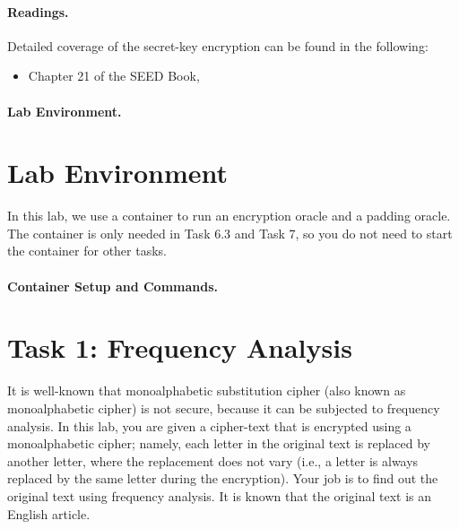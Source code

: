 \paragraph{Readings.}
Detailed coverage of the secret-key encryption can be found in the following:

\begin{itemize}
\item Chapter 21 of the SEED Book, \seedbook
\end{itemize}


\paragraph{Lab Environment.} \seedenvironmentB


\section{Lab Environment}

In this lab, we use a container to run an encryption oracle
and a padding oracle. The container is only needed in Task 
6.3 and Task 7, so you do not need to start the container 
for other tasks. 


\paragraph{Container Setup and Commands.}




\section{Task 1: Frequency Analysis}

It is well-known that monoalphabetic substitution cipher (also known as monoalphabetic cipher)
is not secure, because it can be subjected to frequency analysis. In this lab, you are given
a cipher-text that is encrypted using a monoalphabetic cipher; namely,
each letter in the original text is replaced by another letter,
where the replacement does not vary (i.e., a letter is always replaced by the same letter
during the encryption). Your job is to find out the original text using
frequency analysis. It is known that the original text is an English article.


